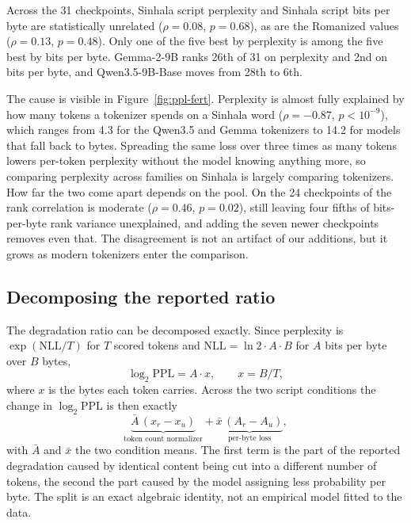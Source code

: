 \documentclass[11pt]{article}
\begin{document}
Across the 31 checkpoints, Sinhala script perplexity and Sinhala script bits per byte
are statistically unrelated ($\rho = 0.08$, $p = 0.68$), as are the Romanized values
($\rho = 0.13$, $p = 0.48$). Only one of the five best by perplexity is among the five
best by bits per byte. Gemma-2-9B ranks 26th of 31 on perplexity and 2nd on bits per
byte, and Qwen3.5-9B-Base moves from 28th to 6th.

The cause is visible in Figure~\ref{fig:ppl-fert}. Perplexity is almost fully explained
by how many tokens a tokenizer spends on a Sinhala word ($\rho = -0.87$, $p < 10^{-9}$),
which ranges from 4.3 for the Qwen3.5 and Gemma tokenizers to 14.2 for models that fall
back to bytes. Spreading the same loss over three times as many tokens lowers per-token
perplexity without the model knowing anything more, so comparing perplexity across
families on Sinhala is largely comparing tokenizers. How far the two come apart depends
on the pool. On the 24 checkpoints of \citet{rajapakse-weerasinghe-2026-script} the rank
correlation is moderate ($\rho = 0.46$, $p = 0.02$), still leaving four fifths of
bits-per-byte rank variance unexplained, and adding the seven newer checkpoints removes
even that. The disagreement is not an artifact of our additions, but it grows as modern
tokenizers enter the comparison.

\subsection{Decomposing the reported ratio}
\label{sec:decomp}

The degradation ratio can be decomposed exactly. Since
perplexity is $\exp(\mathrm{NLL}/T)$ for $T$ scored tokens and
$\mathrm{NLL} = \ln 2 \cdot A \cdot B$ for $A$ bits per byte over $B$ bytes,
\begin{equation}
\log_2 \mathrm{PPL} = A \cdot x, \qquad x = B/T,
\label{eq:identity}
\end{equation}
where $x$ is the bytes each token carries. Across the two script conditions the
change in $\log_2 \mathrm{PPL}$ is then exactly
\begin{equation}
\underbrace{\bar{A}\,(x_r - x_u)}_{\text{token count normalizer}}
+ \underbrace{\bar{x}\,(A_r - A_u)}_{\text{per-byte loss}},
\label{eq:decomp}
\end{equation}
with $\bar{A}$ and $\bar{x}$ the two condition means. The first term is the part of the
reported degradation caused by identical content being cut into a different number of
tokens, the second the part caused by the model assigning less probability per byte. The
split is an exact algebraic identity, not an empirical model fitted to the data.
\end{document}
